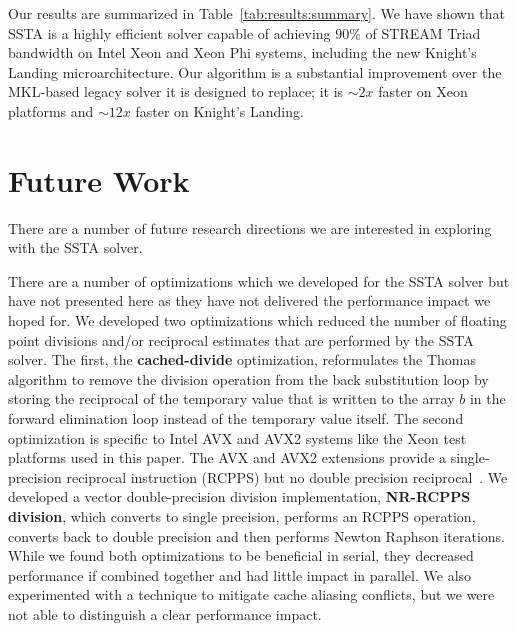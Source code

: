 \documentclass{sig-alternate-05-2015}
\begin{document}
Our results are summarized in Table~\ref{tab:results:summary}.
We have shown that SSTA is a highly efficient solver capable of achieving 90\%
  of STREAM Triad bandwidth on Intel Xeon and Xeon Phi systems, including the new
  Knight's Landing microarchitecture.
Our algorithm is a substantial improvement over the MKL-based legacy solver it
  is designed to replace; it is \(\sim 2x\) faster on Xeon platforms and
  \(\sim 12x\) faster on Knight's Landing.

\section{Future Work}
\label{sec:future_work}

There are a number of future research directions we are interested in exploring
  with the SSTA solver.

There are a number of optimizations which we developed for the SSTA
  solver but have not presented here as they have not delivered the performance
  impact we hoped for.
We developed two optimizations which reduced the number of floating point
  divisions and/or reciprocal estimates that are performed by the SSTA solver. 
The first, the \textbf{cached-divide} optimization, reformulates the Thomas 
  algorithm to remove the division operation from the back substitution loop by
  storing the reciprocal of the temporary value that is written to the array
  \(b\) in the forward elimination loop instead of the temporary value itself.
The second optimization is specific to Intel AVX and AVX2 systems like the Xeon
  test platforms used in this paper.
The AVX and AVX2 extensions provide a single-precision reciprocal instruction
  (RCPPS) but no double precision reciprocal~\cite{intel_opt_manual}.
We developed a vector double-precision division implementation,
  \textbf{NR-RCPPS division}, which converts to single precision, performs an
  RCPPS operation, converts back to double precision and then performs Newton
  Raphson iterations.
While we found both optimizations to be beneficial in serial, they decreased
  performance if combined together and had little impact in parallel.
We also experimented with a technique to mitigate cache aliasing
  conflicts, but we were not able to distinguish a clear performance impact.
\end{document}
